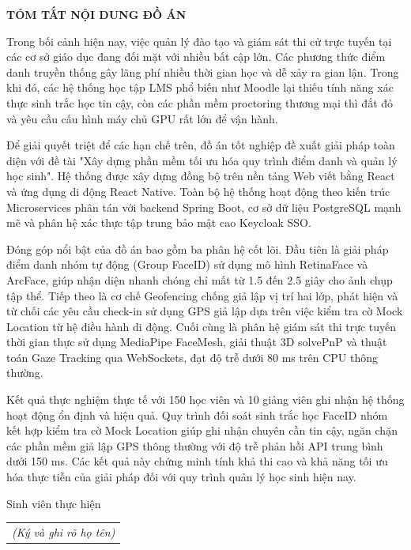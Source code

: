 \documentclass[../DoAn.tex]{subfiles}
\begin{document}
\begin{center}
    \Large{\textbf{TÓM TẮT NỘI DUNG ĐỒ ÁN}}\\
\end{center}
\vspace{1cm}
\hspace*{1.5cm}Trong bối cảnh hiện nay, việc quản lý đào tạo và giám sát thi cử trực tuyến tại các cơ sở giáo dục đang đối mặt với nhiều bất cập lớn. Các phương thức điểm danh truyền thống gây lãng phí nhiều thời gian học và dễ xảy ra gian lận. Trong khi đó, các hệ thống học tập LMS phổ biến như Moodle lại thiếu tính năng xác thực sinh trắc học tin cậy, còn các phần mềm proctoring thương mại thì đắt đỏ và yêu cầu cấu hình máy chủ GPU rất lớn để vận hành.

\hspace*{1.5cm}Để giải quyết triệt để các hạn chế trên, đồ án tốt nghiệp đề xuất giải pháp toàn diện với đề tài "Xây dựng phần mềm tối ưu hóa quy trình điểm danh và quản lý học sinh". Hệ thống được xây dựng đồng bộ trên nền tảng Web viết bằng React và ứng dụng di động React Native. Toàn bộ hệ thống hoạt động theo kiến trúc Microservices phân tán với backend Spring Boot, cơ sở dữ liệu PostgreSQL mạnh mẽ và phân hệ xác thực tập trung bảo mật cao Keycloak SSO.

\hspace*{1.5cm}Đóng góp nổi bật của đồ án bao gồm ba phân hệ cốt lõi. Đầu tiên là giải pháp điểm danh nhóm tự động (Group FaceID) sử dụng mô hình RetinaFace và ArcFace, giúp nhận diện nhanh chóng chỉ mất từ 1.5 đến 2.5 giây cho ảnh chụp tập thể. Tiếp theo là cơ chế Geofencing chống giả lập vị trí hai lớp, phát hiện và từ chối các yêu cầu check-in sử dụng GPS giả lập dựa trên việc kiểm tra cờ Mock Location từ hệ điều hành di động. Cuối cùng là phân hệ giám sát thi trực tuyến thời gian thực sử dụng MediaPipe FaceMesh, giải thuật 3D solvePnP và thuật toán Gaze Tracking qua WebSockets, đạt độ trễ dưới 80 ms trên CPU thông thường.

\hspace*{1.5cm}Kết quả thực nghiệm thực tế với 150 học viên và 10 giảng viên ghi nhận hệ thống hoạt động ổn định và hiệu quả. Quy trình đối soát sinh trắc học FaceID nhóm kết hợp kiểm tra cờ Mock Location giúp ghi nhận chuyên cần tin cậy, ngăn chặn các phần mềm giả lập GPS thông thường với độ trễ phản hồi API trung bình dưới 150 ms. Các kết quả này chứng minh tính khả thi cao và khả năng tối ưu hóa thực tiễn của giải pháp đối với quy trình quản lý học sinh hiện nay.
\begin{flushright}
Sinh viên thực hiện\\
\begin{tabular}{@{}c@{}}
\textit{(Ký và ghi rõ họ tên)}
\end{tabular}
\end{flushright}
\end{document}
